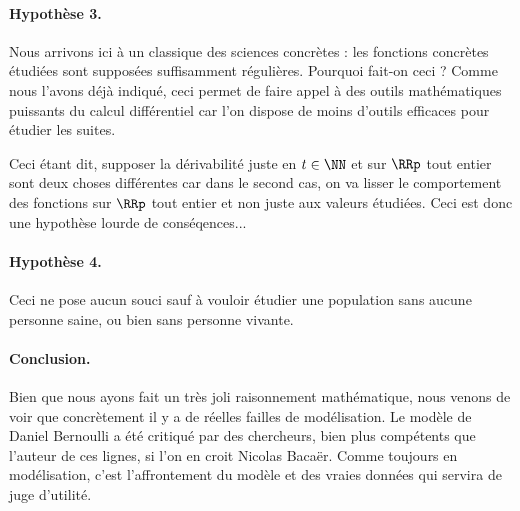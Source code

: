 

\paragraph{Hypothèse 3.} Nous arrivons ici à un classique des sciences concrètes : les fonctions concrètes étudiées sont supposées suffisamment régulières. Pourquoi fait-on ceci ? Comme nous l'avons déjà indiqué, ceci permet de faire appel à des outils mathématiques puissants du calcul différentiel car l'on dispose de moins d'outils efficaces pour étudier les suites. 

\smallskip

Ceci étant dit, supposer la dérivabilité juste en $t \in \NN$ et sur $\RRp$ tout entier sont deux choses différentes car dans le second cas, on va lisser le comportement des fonctions sur $\RRp$ tout entier et non juste aux valeurs étudiées. Ceci est donc une hypothèse lourde de conséqences...



\paragraph{Hypothèse 4.} Ceci ne pose aucun souci sauf à vouloir étudier une population sans aucune personne saine, ou bien sans personne vivante.




\paragraph{Conclusion.} Bien que nous ayons fait un très joli raisonnement mathématique, nous venons de voir que concrètement il y a de réelles failles de modélisation. Le modèle de Daniel Bernoulli a été critiqué par des chercheurs, bien plus compétents que l'auteur de ces lignes, si l'on en croit Nicolas Bacaër. Comme toujours en modélisation, c'est l'affrontement du modèle et des vraies données qui servira de juge d'utilité.